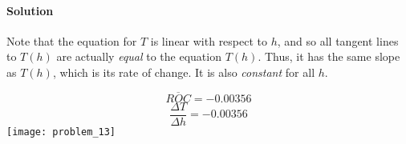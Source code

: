 \documentclass{article}
\begin{document}
  \paragraph{Solution} Note that the equation for \(T\) is linear with respect to \(h\), and so all tangent lines to \(T(h)\) are actually \textit{equal} to the equation \(T(h)\). Thus, it has the same slope as \(T(h)\), which is its rate of change. It is also \textit{constant} for all \(h\).

  \begin{equation}
    \overline{ROC} = \boxed{-0.00356}
  \end{equation}
  \begin{equation}
    \frac{\Delta{T}}{\Delta{h}} = \boxed{-0.00356}
  \end{equation}
  \texttt{[image: problem\_13]}
\end{document}
